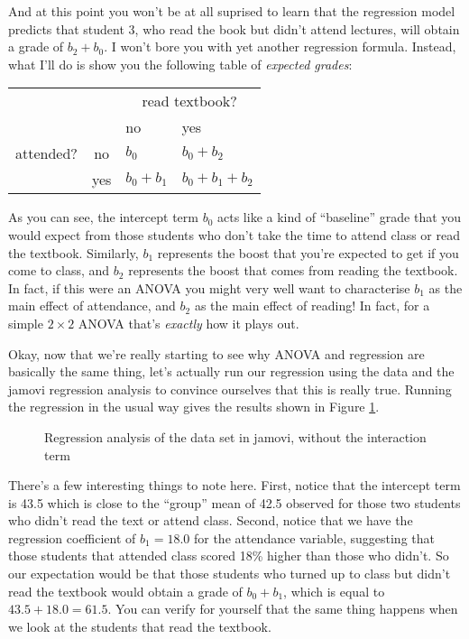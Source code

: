 And at this point you won't be at all suprised to learn that the regression model predicts that student 3, who read the book but didn't attend lectures, will obtain a grade of $b_2 + b_0$. I won't bore you with yet another regression formula. Instead, what I'll do is show you the following table of {\it expected grades}:
\begin{center}
\begin{tabular}{cc|ll} 
& & \multicolumn{2}{c}{read textbook?} \\
& & no & yes \\ \hline
attended? & no & $b_0$ & $b_0 + b_2$ \\
& yes & $b_0 + b_1$ & $b_0 + b_1 + b_2$ 
\end{tabular}
\end{center} 
As you can see, the intercept term $b_0$ acts like a kind of ``baseline'' grade that you would expect from those students who don't take the time to attend class or read the textbook. Similarly, $b_1$ represents the boost that you're expected to get if you come to class, and $b_2$ represents the boost that comes from reading the textbook. In fact, if this were an ANOVA you might very well want to characterise $b_1$ as the main effect of attendance, and $b_2$ as the main effect of reading! In fact, for a simple $2 \times 2$ ANOVA that's {\it exactly} how it plays out. 

Okay, now that we're really starting to see why ANOVA and regression are basically the same thing, let's actually run our regression using the  data and the jamovi regression analysis to convince ourselves that this is really true. Running the regression in the usual way gives the results shown in Figure \ref{fig:factorialanova7}.

\begin{figure}[!htb]
\begin{center}
\caption{Regression analysis of the  data set in jamovi, without the interaction term}
\label{fig:factorialanova7}
\HR
\end{center}
\end{figure}

There's a few interesting things to note here. First, notice that the intercept term is 43.5 which is close to the ``group'' mean of 42.5 observed for those two students who didn't read the text or attend class. Second, notice that we have the regression coefficient of $b_1 = 18.0$ for the attendance variable, suggesting that those students that attended class scored 18\% higher than those who didn't. So our expectation would be that those students who turned up to class but didn't read the textbook would obtain a grade of $b_0 + b_1$, which is equal to $43.5 + 18.0 = 61.5$. You can verify for yourself that the same thing happens when we look at the students that read the textbook.

